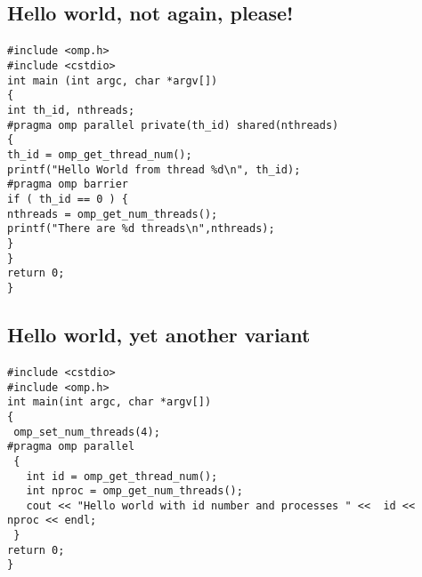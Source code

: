 \documentclass[%
oneside,                 %
final,                   %
10pt]{article}
\begin{document}
\noindent



\subsection*{Hello world, not again, please!}

\paragraph{}


















\begin{verbatim}
#include <omp.h>
#include <cstdio>
int main (int argc, char *argv[])
{
int th_id, nthreads;
#pragma omp parallel private(th_id) shared(nthreads)
{
th_id = omp_get_thread_num();
printf("Hello World from thread %d\n", th_id);
#pragma omp barrier
if ( th_id == 0 ) {
nthreads = omp_get_num_threads();
printf("There are %d threads\n",nthreads);
}
}
return 0;
}

\end{verbatim}



\subsection*{Hello world, yet another variant}

\paragraph{}














\begin{verbatim}
#include <cstdio>
#include <omp.h>
int main(int argc, char *argv[]) 
{
 omp_set_num_threads(4); 
#pragma omp parallel
 {
   int id = omp_get_thread_num();
   int nproc = omp_get_num_threads(); 
   cout << "Hello world with id number and processes " <<  id <<  nproc << endl;
 } 
return 0;
}

\end{verbatim}
\end{document}

